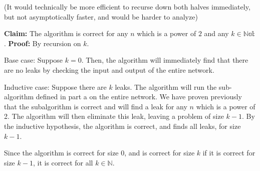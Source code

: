 \documentclass[11pt]{article}
\begin{document}
(It would technically be more efficient to recurse down both halves immediately, but not asymptotically faster, and would be harder to analyze)

\textbf{Claim: } The algorithm is correct for any $n$ which is a power of $2$ and any $k \in \mathbb{Nat}$.
\textbf{Proof: } By recursion on $k$. 

Base case:
Suppose $k = 0$. Then, the algorithm will immediately find that there are no leaks by checking the input and output of the entire network.

Inductive case:
Suppose there are $k$ leaks. The algorithm will run the sub-algorithm defined in part a on the entire network. We have proven previously that the subalgorithm is correct and will find a leak for any $n$ which is a power of 2. The algorithm will then eliminate this leak, leaving a problem of size $k-1$. By the inductive hypothesis, the algorithm is correct, and finds all leaks, for size $k-1$. 

Since the algorithm is correct for size $0$, and is correct for size $k$ if it is correct for size $k-1$, it is correct for all $k \in \mathbb{N}$. 
\end{document}
